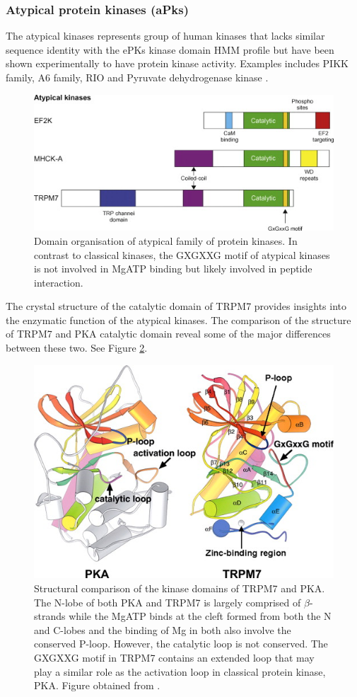 \documentclass[a4paper, 11pt]{report}
\begin{document}
\subsubsection{Atypical protein kinases (aPks)}
The atypical kinases represents group of human kinases that lacks similar sequence identity with the ePKs kinase domain HMM profile but have been shown experimentally to have protein kinase activity. Examples includes PIKK family, A6 family, RIO and Pyruvate dehydrogenase kinase \cite{manning2002protein}.\\ 
\begin{figure}[H]
	\includegraphics[width=.8\linewidth]{figures/atypical.jpg}
	\centering
	\caption{Domain organisation of atypical family of protein kinases. In contrast to classical kinases, the GXGXXG motif of atypical kinases is not involved in MgATP binding but likely involved in peptide interaction.}
	\label{atypical}
\end{figure}
The crystal structure of the catalytic domain of TRPM7 provides insights into the enzymatic function of the atypical kinases. The comparison of the structure of TRPM7 and PKA catalytic domain reveal some of the major differences between these two. See Figure \ref{atypical2}. 
\begin{figure}[H]
	\includegraphics[width=.6\linewidth]{figures/atypical2.jpg}
	\centering
	\caption{Structural comparison of the kinase domains of TRPM7 and PKA. The N-lobe of both PKA and TRPM7 is largely comprised of $\beta$-strands while the MgATP binds at the cleft formed from both the N and C-lobes and the binding of Mg in both also involve the conserved P-loop. However, the catalytic loop is not conserved. The GXGXXG motif in TRPM7 contains an extended loop that may play a similar role as the activation loop in classical protein kinase, PKA. Figure obtained from \cite{wiseman2010ef2k}.} 
	\label{atypical2}
\end{figure}
\end{document}
